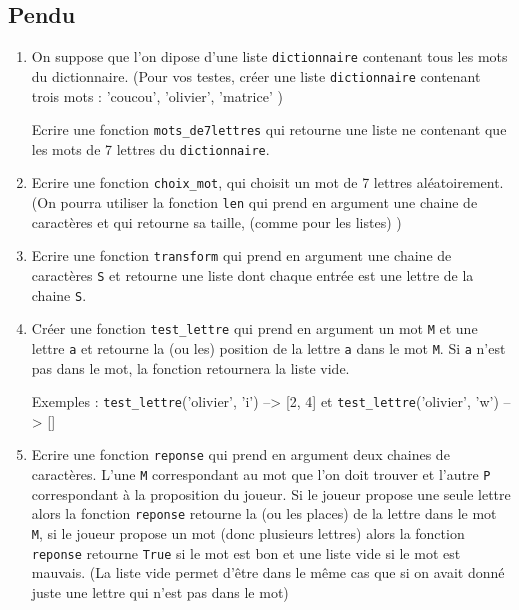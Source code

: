\subsection{Pendu}

\begin{exercice}


\begin{enumerate}
\item On suppose que l'on dipose d'une liste \texttt{dictionnaire} contenant tous les mots du dictionnaire. (Pour vos testes, créer une liste  \texttt{dictionnaire} contenant trois mots : 'coucou', 'olivier', 'matrice' )

Ecrire une fonction \texttt{mots\_de7lettres} qui retourne une liste ne contenant que les mots de 7 lettres du \texttt{dictionnaire}.

\item Ecrire une fonction \texttt{choix\_mot}, qui choisit un mot de 7 lettres aléatoirement.
(On pourra utiliser la fonction \texttt{len} qui prend en argument une chaine de caractères et qui retourne sa taille, (comme pour les listes) ) 

\item Ecrire une fonction \texttt{transform} qui prend en argument une chaine de caractères \texttt{S} et retourne une liste dont chaque entrée est une lettre de la chaine \texttt{S}.

\item Créer une fonction \texttt{test\_lettre} qui prend en argument un mot \texttt{M} et une lettre \texttt{a} et retourne la (ou les) position de la lettre \texttt{a} dans le mot \texttt{M}. Si \texttt{a} n'est pas dans le mot, la fonction retournera la liste vide. 

Exemples : \texttt{test\_lettre}('olivier', 'i') --> [2, 4] et \texttt{test\_lettre}('olivier', 'w') --> []

\item Ecrire une fonction  \texttt{reponse} qui prend en argument deux chaines de caractères. L'une \texttt{M} correspondant au mot que l'on doit trouver et l'autre \texttt{P} correspondant à la proposition du joueur. Si le joueur propose une seule lettre alors  la fonction \texttt{reponse}  retourne la (ou les places) de la lettre dans le mot \texttt{M}, si le joueur propose un mot (donc plusieurs lettres) alors la fonction \texttt{reponse} retourne \texttt{True} si le mot est bon et une liste vide si le mot est mauvais. (La liste vide permet d'être dans le même cas que si on avait donné juste une lettre qui n'est pas dans le mot) 


\end{enumerate}
\end{exercice}
